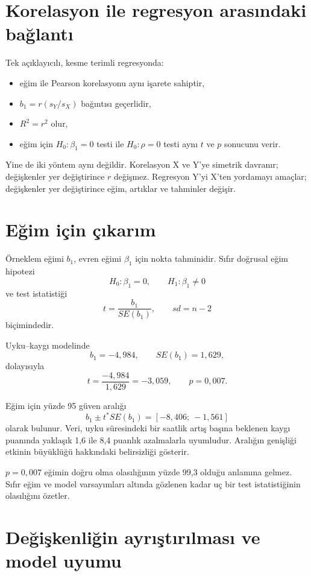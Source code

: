 \section{Korelasyon ile regresyon arasındaki bağlantı}

Tek açıklayıcılı, kesme terimli regresyonda:

\begin{itemize}
  \item eğim ile Pearson korelasyonu aynı işarete sahiptir,
  \item $b_1=r(s_Y/s_X)$ bağıntısı geçerlidir,
  \item $R^2=r^2$ olur,
  \item eğim için $H_0:\beta_1=0$ testi ile $H_0:\rho=0$ testi aynı $t$ ve $p$ sonucunu verir.
\end{itemize}

Yine de iki yöntem aynı değildir. Korelasyon X ve Y'ye simetrik davranır;
değişkenler yer değiştirince $r$ değişmez. Regresyon Y'yi X'ten yordamayı
amaçlar; değişkenler yer değiştirince eğim, artıklar ve tahminler değişir.

\section{Eğim için çıkarım}

Örneklem eğimi $b_1$, evren eğimi $\beta_1$ için nokta tahminidir. Sıfır
doğrusal eğim hipotezi
\[
H_0:\beta_1=0,
\qquad
H_1:\beta_1\neq0
\]
ve test istatistiği
\[
t=\frac{b_1}{SE(b_1)},
\qquad sd=n-2
\]
biçimindedir.

Uyku--kaygı modelinde
\[
b_1=-4{,}984,
\qquad SE(b_1)=1{,}629,
\]
dolayısıyla
\[
t=\frac{-4{,}984}{1{,}629}=-3{,}059,
\qquad p=0{,}007.
\]

Eğim için yüzde 95 güven aralığı
\[
b_1\pm t^*SE(b_1)
=[-8{,}406;\ -1{,}561]
\]
olarak bulunur. Veri, uyku süresindeki bir saatlik artış başına beklenen kaygı
puanında yaklaşık 1,6 ile 8,4 puanlık azalmalarla uyumludur. Aralığın genişliği
etkinin büyüklüğü hakkındaki belirsizliği gösterir.

\begin{mistakebox}
$p=0{,}007$ eğimin doğru olma olasılığının yüzde 99,3 olduğu anlamına gelmez.
Sıfır eğim ve model varsayımları altında gözlenen kadar uç bir test
istatistiğinin olasılığını özetler.
\end{mistakebox}

\section{Değişkenliğin ayrıştırılması ve model uyumu}

